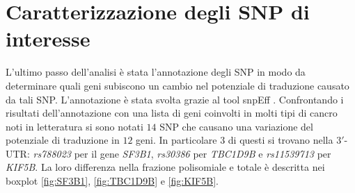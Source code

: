 \section{Caratterizzazione degli SNP di interesse}
L'ultimo passo dell'analisi \`e stata l'annotazione degli SNP in modo da determinare quali geni subiscono un cambio nel potenziale di traduzione causato da tali SNP.
L'annotazione \`e stata svolta grazie al tool snpEff \cite{snpeff}.
Confrontando i risultati dell'annotazione con una lista di geni coinvolti in molti tipi di cancro noti in letteratura si sono notati $14$ SNP che causano una variazione del potenziale di traduzione in $12$ geni.
In particolare $3$ di questi si trovano nella $3'$-UTR: \emph{rs788023} per il gene \emph{SF3B1}, \emph{rs30386} per \emph{TBC1D9B} e \emph{rs11539713} per \emph{KIF5B}.
La loro differenza nella frazione polisomiale e totale \`e descritta nei boxplot \ref{fig:SF3B1}, \ref{fig:TBC1D9B} e \ref{fig:KIF5B}.
